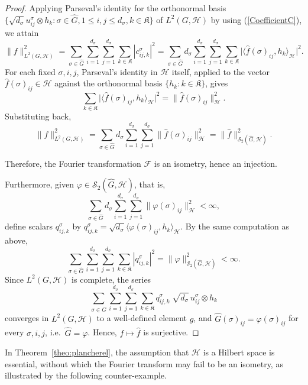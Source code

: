 \documentclass[10pt,a4paper]{amsart}
\begin{document}
\begin{proof}
\noindent Applying Parseval's identity for
the orthonormal basis
 $\{\sqrt{d_\sigma}u^\sigma_{ij}\otimes h_k:\sigma\in \widehat{G}, 1\le i,j\le d_\sigma, k\in \mathfrak{K}\}$ of $L^2(G,\mathcal{H})$
by using (\ref{CoefficientC}), we attain
\[
\|f\|_{L^2(G,\mathcal{H})}^2=\sum_{\sigma\in \widehat{G}}\sum_{i=1}^{d_\sigma}\sum_{j=1}^{d_\sigma}\sum_{k\in \mathfrak{K}}|c^\sigma_{ij,k}|^2
=\sum_{\sigma\in \widehat{G}}d_\sigma\sum_{i=1}^{d_\sigma}\sum_{j=1}^{d_\sigma}\sum_{k\in \mathfrak{K}}\big|\langle\widehat f(\sigma)_{ij},h_k\rangle_\mathcal{H}\big|^2.
\]
For each fixed $\sigma,i,j$, Parseval's identity in $\mathcal{H}$ itself, applied to the vector
$\widehat f(\sigma)_{ij}\in\mathcal{H}$ against the orthonormal basis $\{h_k:k\in \mathfrak{K}\}$, gives
\[
\sum_{k\in \mathfrak{K}}\big|\langle \widehat f(\sigma)_{ij},h_k\rangle_\mathcal{H}\big|^2=\|\widehat f(\sigma)_{ij}\|_\mathcal{H}^2.
\]
Substituting back,
\[
\|f\|_{L^2(G,\mathcal{H})}^2=\sum_{\sigma\in \widehat{G}}d_\sigma\sum_{i=1}^{d_\sigma}\sum_{j=1}^{d_\sigma}\|\widehat f(\sigma)_{ij}\|_\mathcal{H}^2
=\|\widehat f\|_{\mathscr{S}_2(\widehat{G},\mathcal{H})}^2.
\]

Therefore, the Fourier transformation $\mathscr{F}$ is an isometry, hence  an  injection. 
\smallskip

Furthermore, given $\varphi\in \mathscr{S}_2(\widehat{G},\mathcal{H})$, that is,  $$\sum_{\sigma\in \widehat{G}}d_\sigma\sum_{i=1}^{d_\sigma}\sum_{j=1}^{d_\sigma}\|\varphi(\sigma)_{ij}\|_\mathcal{H}^2<\infty, $$
 define scalars $q^\sigma_{ij,k}$ by
$q^\sigma_{ij,k}=\sqrt{d_\sigma}\langle\varphi(\sigma)_{ij},h_k\rangle_\mathcal{H}$. By the same computation as above, $$\sum_{\sigma\in \widehat{G}}\sum_{i=1}^{d_\sigma}\sum_{j=1}^{d_\sigma}\sum_{k\in \mathfrak{K}}
|q^\sigma_{ij,k}|^2=\|\varphi\|_{\mathscr{S}_2(\widehat{G},\mathcal{H})}^2<\infty.$$
Since $L^2(G,\mathcal{H})$ is complete,  the series
\[
\sum_{\sigma\in \widehat{G}}\sum_{i=1}^{d_\sigma}\sum_{j=1}^{d_\sigma}\sum_{k\in \mathfrak{K}}q^\sigma_{ij,k}\;\sqrt{d_\sigma}\,u^\sigma_{ij}\otimes h_k
\]
converges in $L^2(G,\mathcal{H})$ to a well-defined element $g$, and  
 $\widehat{G}(\sigma)_{ij}=\varphi(\sigma)_{ij}$ for every $\sigma,i,j$,
i.e.\ $\widehat{G}=\varphi$. Hence, $f\mapsto\widehat f$ is surjective. 
\end{proof}
In Theorem~\ref{theo:plancherel}, the assumption that \(\mathcal{H}\) is a Hilbert space is essential, without which the Fourier transform may fail to be an isometry, as illustrated by the following counter-example.
\end{document}
